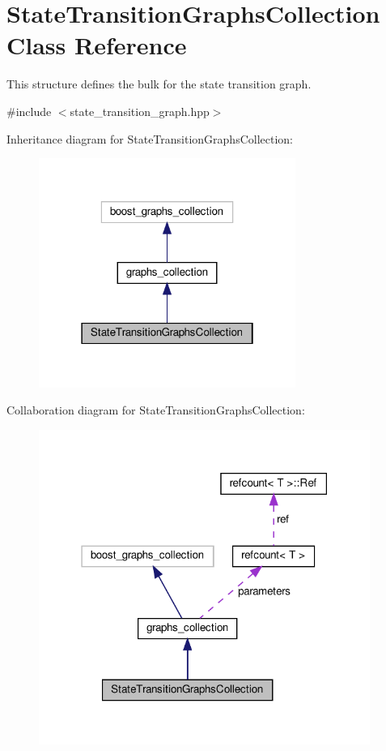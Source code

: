 \hypertarget{classStateTransitionGraphsCollection}{}\section{State\+Transition\+Graphs\+Collection Class Reference}
\label{classStateTransitionGraphsCollection}


This structure defines the bulk for the state transition graph.  




{\ttfamily \#include $<$state\+\_\+transition\+\_\+graph.\+hpp$>$}



Inheritance diagram for State\+Transition\+Graphs\+Collection\+:
\nopagebreak
\begin{figure}[H]
\begin{center}
\leavevmode
\includegraphics[width=238pt]{d2/d5c/classStateTransitionGraphsCollection__inherit__graph}
\end{center}
\end{figure}


Collaboration diagram for State\+Transition\+Graphs\+Collection\+:
\nopagebreak
\begin{figure}[H]
\begin{center}
\leavevmode
\includegraphics[width=307pt]{df/ded/classStateTransitionGraphsCollection__coll__graph}
\end{center}
\end{figure}
